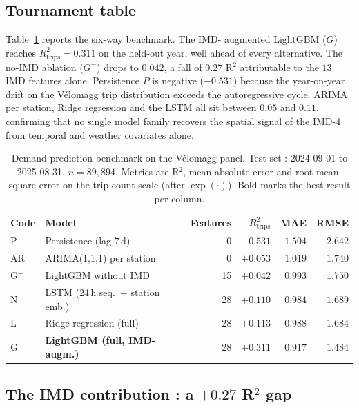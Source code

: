 \documentclass[11pt,a4paper]{article}
\begin{document}
\subsection{Tournament table}

Table~\ref{tab:bench} reports the six-way benchmark.  The IMD-
augmented LightGBM ($G$) reaches $R^{2}_{\text{trips}} = 0.311$
on the held-out year, well ahead of every alternative.  The
no-IMD ablation ($G^{-}$) drops to $0.042$, a fall of $0.27$
R$^{2}$ attributable to the $13$ IMD features alone.  Persistence
$P$ is negative ($-0.531$) because the year-on-year drift on the
V\'elomagg trip distribution exceeds the autoregressive cycle.
ARIMA per station, Ridge regression and the LSTM all sit between
$0.05$ and $0.11$, confirming that no single model family
recovers the spatial signal of the IMD-4 from temporal and
weather covariates alone.

\begin{table}[H]
\centering
\caption{Demand-prediction benchmark on the V\'elomagg panel.
Test set : 2024-09-01 to 2025-08-31, $n = 89{,}894$.
Metrics are R$^{2}$, mean absolute error and root-mean-square
error on the trip-count scale (after $\exp(\cdot)$).  Bold marks
the best result per column.}
\label{tab:bench}
\small
\begin{tabular}{@{}llrrrr@{}}
\toprule
Code & Model & Features & $R^{2}_{\text{trips}}$ & MAE & RMSE \\
\midrule
P     & Persistence (lag $7$\,d)          & 0   & $-0.531$ & $1.504$ & $2.642$ \\
AR    & ARIMA(1,1,1) per station          & 0   & $+0.053$ & $1.019$ & $1.740$ \\
G$^-$ & LightGBM without IMD              & 15  & $+0.042$ & $0.993$ & $1.750$ \\
N     & LSTM (24\,h seq.\ + station emb.) & 28  & $+0.110$ & $0.984$ & $1.689$ \\
L     & Ridge regression (full)           & 28  & $+0.113$ & $0.988$ & $1.684$ \\
G     & \textbf{LightGBM (full, IMD-augm.)} & 28 & $\mathbf{+0.311}$ & $\mathbf{0.917}$ & $\mathbf{1.484}$ \\
\bottomrule
\end{tabular}
\end{table}

\subsection{The IMD contribution : a $+0.27$ R$^2$ gap}
\end{document}
